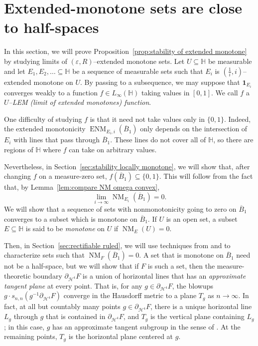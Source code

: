 \documentclass[11pt,reqno]{amsart}
\renewcommand{\H}{\mathbb{H}}
\newcommand{\cH}{\mathcal{H}}
\renewcommand{\epsilon}{\varepsilon}
\newcommand{\0}{\mathbf{0}}
\renewcommand{\1}{\mathbf 1}
\newcommand{\one}{\mathbf{1}}
\renewcommand{\subset}{\subseteq}
\theoremstyle{remark}
\DeclareMathOperator{\NM}{NM}
\DeclareMathOperator{\ENM}{ENM}
\begin{document}
\section{Extended-monotone sets are close to half-spaces}\label{sec:extended monotone}

In this section, we will prove Proposition~\ref{prop:stability of extended monotone} by studying limits of $(\epsilon,R)$--extended monotone sets.  Let $U\subset \H$ be measurable and let $E_1,E_2,\dots\subset \H$ be a sequence of measurable sets such that $E_i$ is $(\frac{1}{i},i)$--extended monotone on $U$.  By passing to a subsequence, we may suppose that $\one_{E_i}$ converges weakly to a function $f\in L_\infty(\H)$ taking values in $[0,1]$.  We call $f$ a \emph{$U$--LEM (limit of extended monotones) function}.

One difficulty of studying $f$ is that it need not take values only in $\{0,1\}$.  Indeed, the extended monotonicity $\ENM_{E_i,i}(\overline{B}_1)$ only depends on the intersection of $E_i$ with lines that pass through $\overline{B}_1$.  These lines do not cover all of $\H$, so there are regions of $\H$ where $f$ can take on arbitrary values.

Nevertheless, in Section~\ref{sec:stability locally monotone}, we will show that, after changing $f$ on a measure-zero set,  $f(\overline{B}_1)\subset \{0,1\}$.  This will follow from the fact that, by Lemma~\ref{lem:compare NM omega convex}, $$\lim_{i\to \infty} \NM_{E_i}(\overline{B}_1)=0.$$
We will show that a sequence of sets with nonmonotonicity going to zero on $\overline{B}_1$ converges to a subset which is monotone on $\overline{B}_1$.  If $U$ is an open set, a subset $E\subset \H$ is said to be \emph{monotone} on $U$ if $\NM_E(U)=0$.

Then, in Section~\ref{sec:rectifiable ruled}, we will use techniques from \cite{CheegerKleinerMetricDiff} and \cite{CKN} to characterize sets such that $\NM_{F}(\overline{B}_1)=0$.  A set that is monotone on $\overline{B}_1$ need not be a half-space, but we will show that if $F$ is such a set, then the measure-theoretic boundary $\partial_{\cH^4} F$ is a union of horizontal lines that has an \emph{approximate tangent plane} at every point.  That is, for any $g\in \partial_{\cH^4} F$, the blowups $g\cdot s_{n,n}(g^{-1} \partial_{\cH^4} F)$ converge in the Hausdorff metric to a plane $T_g$ as $n\to \infty$.  In fact, at all but countably many points $g\in \partial_{\cH^4} F$,  there is a unique horizontal line $L_g$ through $g$ that is contained in $\partial_{\cH^4} F$, and $T_g$ is the vertical plane containing $L_g$; in this case, $g$ has an approximate tangent subgroup in the sense of \cite{MSSCCharacterizations}.
At the remaining points, $T_g$ is the horizontal plane centered at $g$. %
\end{document}
